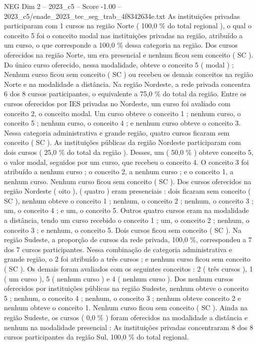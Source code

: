 \begin{textsample}{NEG Dim 2 – 2023\_c5 – Score -1.00 – 2023\_c5/enade\_2023\_tec\_seg\_trab\_4f8342634e.txt}
As instituições privadas participaram com 1 cursos na região Norte ( 100,0 \% do total regional ), o qual o conceito 5 foi o conceito modal nas instituições privadas na região, atribuído a um curso, o que corresponde a 100,0 \% dessa categoria na região.
Dos cursos oferecidos na região Norte, um era presencial e nenhum ficou sem conceito ( SC ).
Do único curso oferecido, nessa modalidade, obteve o conceito 5 ( modal ) ; Nenhum curso ficou sem conceito ( SC ) ou recebeu os demais conceitos na região Norte e na modalidade a distância.
Na região Nordeste, a rede privada concentra 6 dos 8 cursos participantes, o equivalente a 75,0 \% do total da região.
Entre os cursos oferecidos por IES privadas no Nordeste, um curso foi avaliado com conceito 2, o conceito modal.
Um curso obteve o conceito 1 ; nenhum curso, o conceito 5 ; nenhum curso, o conceito 4 ; e nenhum curso obteve o conceito 3.
Nessa categoria administrativa e grande região, quatro cursos ficaram sem conceito ( SC ).
As instituições públicas da região Nordeste participaram com dois cursos ( 25,0 \% do total da região ).
Desses, um ( 50,0 \% ) obteve conceito 5, o valor modal, seguidos por um curso, que recebeu o conceito 4.
O conceito 3 foi atribuído a nenhum curso ; o conceito 2, a nenhum curso ; e o conceito 1, a nenhum curso.
Nenhum curso ficou sem conceito ( SC ).
Dos cursos oferecidos na região Nordeste ( oito ), ( quatro ) eram presenciais : dois ficaram sem conceito ( SC ), nenhum obteve o conceito 1 ; nenhum, o conceito 2 ; nenhum, o conceito 3 ; um, o conceito 4 ; e um, o conceito 5.
Outros quatro cursos eram na modalidade a distância, tendo um curso recebido o conceito 1 ; um, o conceito 2 ; nenhum, o conceito 3 ; e nenhum, o conceito 5.
Dois cursos ficou sem conceito ( SC ).
Na região Sudeste, a proporção de cursos da rede privada, 100,0 \%, correspondeu a 7 dos 7 cursos participantes.
Nessa combinação de categoria administrativa e grande região, o 2 foi atribuído a três cursos ; e nenhum curso ficou sem conceito ( SC ).
Os demais foram avaliados com os seguintes conceitos : 2 ( três cursos ), 1 ( um curso ), 5 ( nenhum curso ) e 4 ( nenhum curso ).
Dos nenhum cursos oferecidos por instituições públicas na região Sudeste, nenhum obteve o conceito 5 ; nenhum, o conceito 4 ; nenhum, o conceito 3 ; nenhum obteve conceito 2 e nenhum obteve o conceito 1.
Nenhum curso ficou sem conceito ( SC ).
Ainda na região Sudeste, os cursos ( 0,0 \% ) foram oferecidos na modalidade a distância e nenhum na modalidade presencial : As instituições privadas concentraram 8 dos 8 cursos participantes da região Sul, 100,0 \% do total regional.

\end{textsample}
